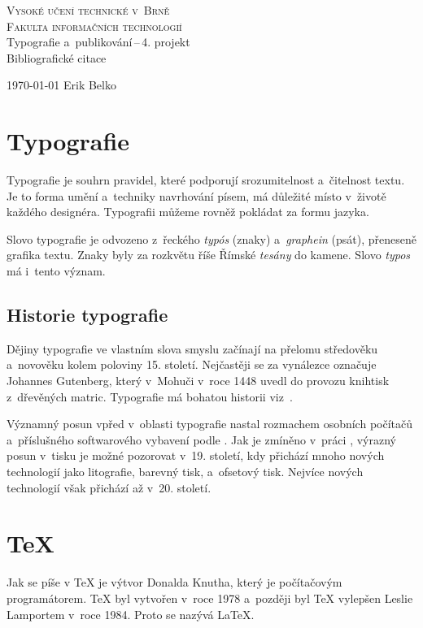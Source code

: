 \documentclass[a4paper, 11pt]{article}[8.4.2020]
\begin{document}
\begin{titlepage}
	\begin{center}
		\Huge \textsc{Vysoké učení technické v~Brně}\\
		\huge \textsc{Fakulta informačních technologií}\\
		\LARGE Typografie a~publikování\,--\,4. projekt\\
		\Huge Bibliografické citace
	\end{center}
	{\Large \today
		\hfill
	Erik Belko }
\end{titlepage}

\section{Typografie}
Typografie je souhrn pravidel, které podporují srozumitelnost a~čitelnost textu. Je to forma umění a~techniky navrhování písem, má důležité místo v~životě každého designéra. Typografii můžeme rovněž pokládat za formu jazyka. \cite{Lupton}
\par Slovo typografie je odvozeno z~řeckého \emph{typós} (znaky) a~\emph{graphein} (psát), přeneseně grafika textu. Znaky byly za rozkvětu říše Římské \emph{tesány} do kamene. Slovo \emph{typos} má i~tento význam. \cite{Olsak}

\subsection{Historie typografie}
Dějiny typografie ve vlastním slova smyslu začínají na přelomu středověku a~novověku kolem poloviny 15. století. Nejčastěji se za vynálezce označuje Johannes Gutenberg, který v~Mohuči v~roce 1448 uvedl do provozu knihtisk z~dřevěných matric. Typografie má bohatou historii viz~\cite{Wiki:Typografie}.
\par Významný posun vpřed v~oblasti typografie nastal rozmachem osobních počítačů a~příslušného softwarového vybavení podle \cite{Rybicka}. Jak je zmíněno v~práci \cite{Jirasek}, výrazný posun v~tisku je možné pozorovat v~19. století, kdy přichází mnoho nových technologií jako litografie, barevný tisk,  a~ofsetový tisk. Nejvíce nových technologií však přichází až v~20. století.

\section{\TeX}
Jak se píše v \cite{FullCircle} {\TeX} je výtvor Donalda Knutha, který je počítačovým programátorem. {\TeX} byl vytvořen v~roce 1978 a~později byl {\TeX} vylepšen Leslie Lamportem v~roce 1984. Proto se nazývá {\LaTeX}.
\end{document}
